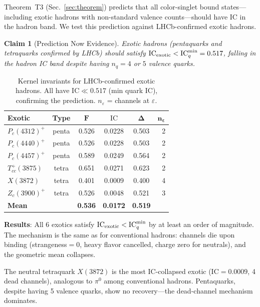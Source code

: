 \documentclass[
  aps,
  prd,
  twocolumn,
  superscriptaddress,
  nofootinbib,
  floatfix
]{revtex4-2}
\newtheorem{claim}{Claim}
\newcommand{\eps}{\varepsilon}
\newcommand{\IC}{\mathrm{IC}}
\begin{document}
Theorem~T3 (Sec.~\ref{sec:theorem}) predicts that all
color-singlet bound states---including exotic hadrons with
non-standard valence counts---should have $\IC$ in the hadron
band.  We test this prediction against LHCb-confirmed exotic
hadrons.

\begin{claim}[Prediction Now Evidence]\label{claim:exotics}
Exotic hadrons (pentaquarks and tetraquarks confirmed by LHCb)
should satisfy $\IC_{\rm exotic} < \IC_q^{\min} = 0.517$,
falling in the hadron IC band despite having $n_q = 4$ or $5$
valence quarks.
\end{claim}

\begin{table}[H]
\caption{Kernel invariants for LHCb-confirmed exotic hadrons.
All have $\IC \ll 0.517$ (min quark IC), confirming the
prediction.  $n_\eps$ = channels at $\eps$.}
\label{tab:exotics}
\centering\small
\begin{tabular}{@{}lccccr@{}}
\toprule
\textbf{Exotic} & \textbf{Type} & $\bm{F}$ &
  $\bm{\IC}$ & $\bm{\Delta}$ & $\bm{n_\eps}$ \\
\midrule
$P_c(4312)^+$ & penta & 0.526 & 0.0228 & 0.503 & 2 \\
$P_c(4440)^+$ & penta & 0.526 & 0.0228 & 0.503 & 2 \\
$P_c(4457)^+$ & penta & 0.589 & 0.0249 & 0.564 & 2 \\
$T_{cc}^+(3875)$ & tetra & 0.651 & 0.0271 & 0.623 & 2 \\
$X(3872)$      & tetra & 0.401 & 0.0009 & 0.400 & 4 \\
$Z_c(3900)^+$  & tetra & 0.526 & 0.0048 & 0.521 & 3 \\
\midrule
\textbf{Mean}  & & \textbf{0.536} & \textbf{0.0172} &
  \textbf{0.519} & \\
\bottomrule
\end{tabular}
\end{table}

\textbf{Results}: All 6 exotics satisfy
$\IC_{\rm exotic} < \IC_q^{\min}$ by at least an order of
magnitude.  The mechanism is the same as for conventional hadrons:
channels die upon binding (strangeness$=0$, heavy flavor
cancelled, charge zero for neutrals), and the geometric mean
collapses.

The neutral tetraquark $X(3872)$ is the most IC-collapsed exotic
($\IC = 0.0009$, 4 dead channels), analogous to $\pi^0$ among
conventional hadrons.  Pentaquarks, despite having 5 valence
quarks, show no recovery---the dead-channel mechanism dominates.
\end{document}

